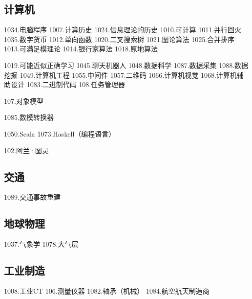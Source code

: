 \subsection{计算机}
1034.电脑程序
1007.计算历史
1024.信息理论的历史
1010.可计算
1011.并行回火
1035.数字货币
1012.单向函数
1020.二叉搜索树
1021.图论算法
1025.合并排序
1013.可满足模理论
1014.银行家算法
1018.原地算法

1019.可能近似正确学习
1045.聊天机器人
1048.数据科学
1087.数据采集
1088.数据挖掘
1049.计算机工程
1055.中间件
1057.二维码
1066.计算机视觉
1068.计算机辅助设计
1083.二进制代码
108.任务管理器

107.对象模型

1085.数模转换器

1050.Scala
1073.Haskell（编程语言）

102.阿兰·图灵


\subsection{交通}
1089.交通事故重建

\subsection{地球物理}
1037.气象学
1078.大气层

\subsection{工业制造}
1008.工业CT
106.测量仪器
1082.轴承（机械）
1084.航空航天制造商
